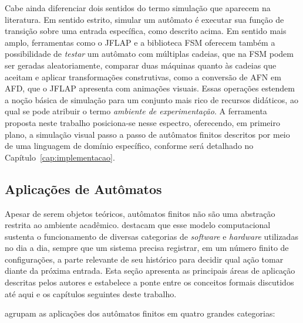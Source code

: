 \documentclass[
    12pt
    ,oneside
    ,a4paper
    ,chapter=TITLE
    ,section=TITLE
    ,sumario=abnt-6027-2012]{abntex2}
\begin{document}
Cabe ainda diferenciar dois sentidos do termo simulação que aparecem na literatura. Em sentido
estrito, simular um autômato é executar sua função de transição sobre uma entrada específica,
como descrito acima. Em sentido mais amplo, ferramentas como o JFLAP \cite{rodger2006jflap} e a
biblioteca FSM \cite{morazan2014} oferecem também a possibilidade de \textit{testar} um
autômato com múltiplas cadeias, que na FSM podem ser geradas aleatoriamente, comparar duas
máquinas quanto às cadeias que aceitam e aplicar transformações construtivas, como a
conversão de AFN em AFD, que o JFLAP apresenta com animações visuais. Essas operações estendem a noção básica de simulação para um conjunto mais rico de
recursos didáticos, ao qual se pode atribuir o termo \textit{ambiente de experimentação}. A
ferramenta proposta neste trabalho posiciona-se nesse espectro, oferecendo, em primeiro plano,
a simulação visual passo a passo de autômatos finitos descritos por meio de uma linguagem de
domínio específico, conforme será detalhado no Capítulo~\ref{cap:implementacao}.

\subsection{Aplicações de Autômatos}
\label{sec:aplicacoes_automatos}

Apesar de serem objetos teóricos, autômatos finitos não são uma abstração restrita ao ambiente
acadêmico.  destacam que esse modelo computacional sustenta o
funcionamento de diversas categorias de \textit{software} e \textit{hardware} utilizadas no dia a dia, sempre que
um sistema precisa registrar, em um número finito de configurações, a parte relevante de seu
histórico para decidir qual ação tomar diante da próxima entrada. Esta seção apresenta as
principais áreas de aplicação descritas pelos autores e estabelece a ponte entre os conceitos
formais discutidos até aqui e os capítulos seguintes deste trabalho.

 agrupam as aplicações dos autômatos finitos em quatro grandes
categorias:
\end{document}
